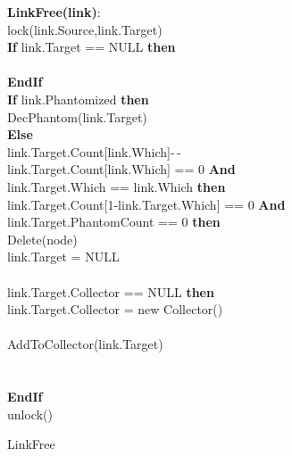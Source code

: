 \setlength{\textfloatsep}{0pt}
\begin{algorithm}[ht]
{\small
{}
{\bf LinkFree(link)}:\\
{\Indp
{lock(link.Source,link.Target)}\\
{\bf If} link.Target == NULL {\bf then}\\
\\
{\bf EndIf}\\
{\bf If} link.Phantomized {\bf then}\\
\quad DecPhantom(link.Target)\\
{\bf Else}\\
\quad link.Target.Count[link.Which]-\,-\\
 link.Target.Count[link.Which] == 0 {\bf And} \\
\quad \quad \quad link.Target.Which == link.Which {\bf then}\\
\quad {} link.Target.Count[1-link.Target.Which] == 0 {\bf And} \\
\quad \quad \quad \quad link.Target.PhantomCount == 0 {\bf then}\\
\quad \quad \quad Delete(node)\\
\quad \quad \quad link.Target = NULL\\
\quad {} \\
\quad \quad {} link.Target.Collector == NULL {\bf then}\\
\quad \quad \quad \quad link.Target.Collector = new Collector()\\
\quad \quad {}\\
\quad \quad \quad AddToCollector(link.Target)\\
\quad {} \\
\\
{\bf EndIf}\\
{unlock()}\\
}
}
\caption{LinkFree}
\label{algorithm:linkfree}
\end{algorithm}
\setlength{\textfloatsep}{0pt}
